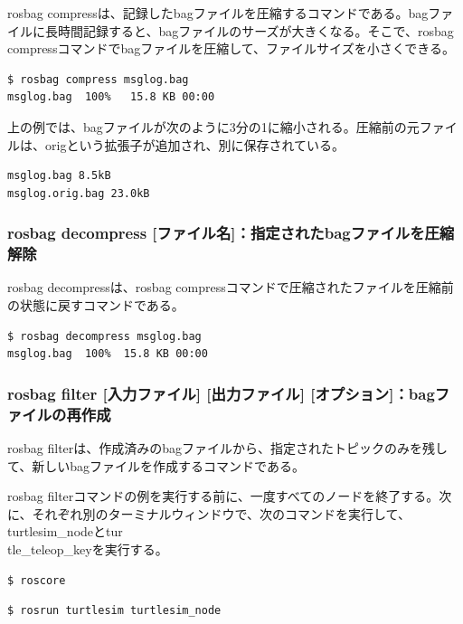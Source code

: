 rosbag compressは、記録したbagファイルを圧縮するコマンドである。bagファイルに長時間記録すると、bagファイルのサーズが大きくなる。そこで、rosbag compressコマンドでbagファイルを圧縮して、ファイルサイズを小さくできる。

\begin{lstlisting}[language=ROS]
$ rosbag compress msglog.bag
msglog.bag  100%   15.8 KB 00:00
\end{lstlisting}

上の例では、bagファイルが次のように3分の1に縮小される。圧縮前の元ファイルは、origという拡張子が追加され、別に保存されている。

\begin{lstlisting}[language=ROS]
msglog.bag 8.5kB
msglog.orig.bag 23.0kB
\end{lstlisting}

\subsubsection{rosbag decompress [ファイル名]：指定されたbagファイルを圧縮解除}

rosbag decompressは、rosbag compressコマンドで圧縮されたファイルを圧縮前の状態に戻すコマンドである。

\begin{lstlisting}[language=ROS]
$ rosbag decompress msglog.bag
msglog.bag  100%  15.8 KB 00:00
\end{lstlisting}

\subsubsection{rosbag filter [入力ファイル] [出力ファイル] [オプション]：bagファイルの再作成}

rosbag filterは、作成済みのbagファイルから、指定されたトピックのみを残して、新しいbagファイルを作成するコマンドである。

rosbag filterコマンドの例を実行する前に、一度すべてのノードを終了する。次に、それぞれ別のターミナルウィンドウで、次のコマンドを実行して、turtlesim\_nodeとtur\\tle\_teleop\_keyを実行する。

\begin{lstlisting}[language=ROS]
$ roscore
\end{lstlisting}

\begin{lstlisting}[language=ROS]
$ rosrun turtlesim turtlesim_node
\end{lstlisting}

